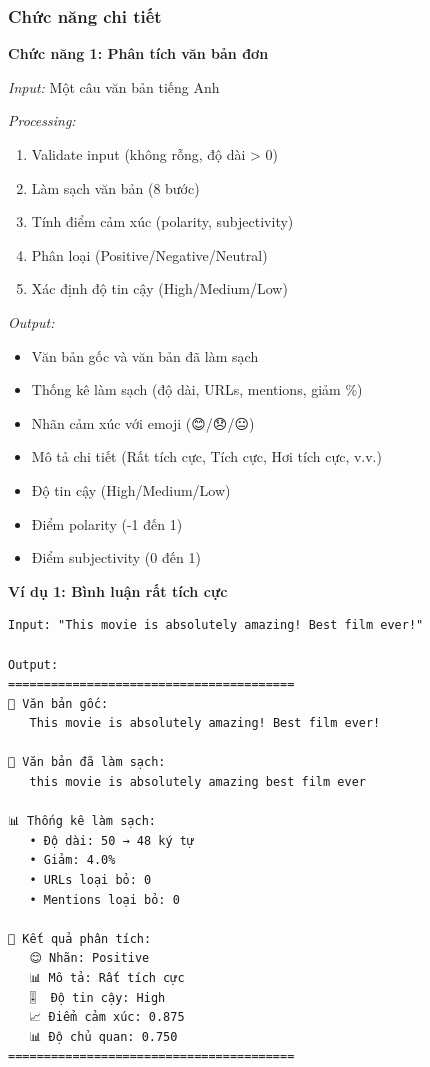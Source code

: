 \subsubsection{Chức năng chi tiết}

\textbf{Chức năng 1: Phân tích văn bản đơn}

\textit{Input:} Một câu văn bản tiếng Anh

\textit{Processing:}
\begin{enumerate}
    \item Validate input (không rỗng, độ dài > 0)
    \item Làm sạch văn bản (8 bước)
    \item Tính điểm cảm xúc (polarity, subjectivity)
    \item Phân loại (Positive/Negative/Neutral)
    \item Xác định độ tin cậy (High/Medium/Low)
\end{enumerate}

\textit{Output:}
\begin{itemize}
    \item Văn bản gốc và văn bản đã làm sạch
    \item Thống kê làm sạch (độ dài, URLs, mentions, giảm \%)
    \item Nhãn cảm xúc với emoji (😊/😞/😐)
    \item Mô tả chi tiết (Rất tích cực, Tích cực, Hơi tích cực, v.v.)
    \item Độ tin cậy (High/Medium/Low)
    \item Điểm polarity (-1 đến 1)
    \item Điểm subjectivity (0 đến 1)
\end{itemize}

\textbf{Ví dụ 1: Bình luận rất tích cực}
\begin{verbatim}
Input: "This movie is absolutely amazing! Best film ever!"

Output:
========================================
📝 Văn bản gốc:
   This movie is absolutely amazing! Best film ever!

🧹 Văn bản đã làm sạch:
   this movie is absolutely amazing best film ever

📊 Thống kê làm sạch:
   • Độ dài: 50 → 48 ký tự
   • Giảm: 4.0%
   • URLs loại bỏ: 0
   • Mentions loại bỏ: 0

🎯 Kết quả phân tích:
   😊 Nhãn: Positive
   📊 Mô tả: Rất tích cực
   🎚️  Độ tin cậy: High
   📈 Điểm cảm xúc: 0.875
   📊 Độ chủ quan: 0.750
========================================
\end{verbatim}

